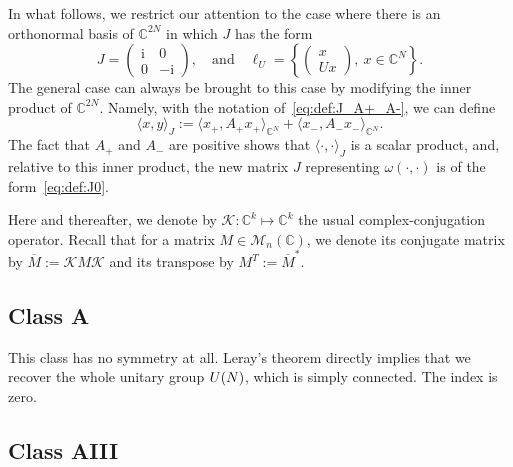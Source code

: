 \documentclass[11pt]{amsart}
\numberwithin{equation}{section} %
\newcommand\1{{\mathds 1}}
\def\C{{\mathbb C}}
\def\ri{{\mathrm{i}}}
\def\cK{{\mathcal K}}
\def\cM{{\mathcal M}}
\def\U{{\rm U}}
\def\bra{\langle}
\def\ket{\rangle}
\begin{document}
In what follows, we restrict our attention to the case where there is an orthonormal basis of $\C^{2N}$ in which $J$ has the form
\begin{equation} \label{eq:def:J0}
    J = \begin{pmatrix}
    \ri & 0 \\ 0 & -\ri
\end{pmatrix}, \quad \text{and} \quad \ell_U = \left\{ \begin{pmatrix} x  \\ U x\end{pmatrix}, \ x \in \C^N \right\}.
\end{equation}
The general case can always be brought to this case by modifying the inner product of $\C^{2N}$. Namely, with the notation of~\eqref{eq:def:J_A+_A-}, we can define
\[
    \bra x, y \ket_{J} :=  \bra x_+, A_+ x_+ \ket_{\C^N} + \bra x_-, A_- x_- \ket_{\C^N}.
\]
The fact that $A_+$ and $A_-$ are positive shows that $\bra \cdot, \cdot \ket_J$ is a scalar product, and, relative to this inner product, the new matrix $J$ representing $\omega(\cdot, \cdot)$ is of the form~\eqref{eq:def:J0}.

\medskip

Here and thereafter, we denote by $\cK : \C^k \mapsto  \C^k$ the usual complex-conjugation operator. Recall that for a matrix $M \in \cM_n(\mathbb C)$, we denote its conjugate matrix by $\overline{M} := \cK M \cK$ and its transpose by $M^T := \overline{M}^*$. 

\subsection{Class A}
\label{sec:class_A}

This class has no symmetry at all. Leray's theorem directly implies that we recover the whole unitary group $\U(N)$, which is simply connected. The index is zero.

\subsection{Class AIII}
\label{sec:class_AIII}
\end{document}
